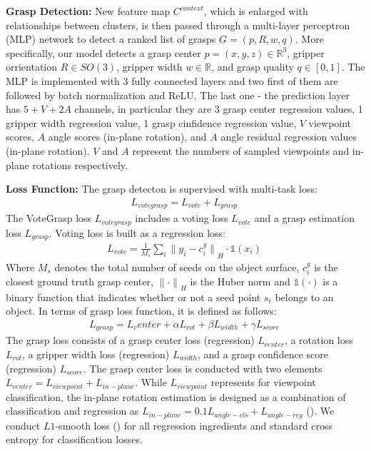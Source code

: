 \textbf{Grasp Detection:} New feature map $C^{context}$, which is enlarged with relationships between clusters, is then passed through a multi-layer perceptron (MLP) network to detect a ranked list of grasps $G=(p,R,w,q)$. More specifically, our model detects a grasp center $p=(x,y,z) \in \mathbb{R}^3$, gripper orrientation $R \in SO(3)$, gripper width $w \in \mathbb{R}$, and grasp quality $q \in [0,1]$. The MLP is implemented with 3 fully connected layers and two first of them are followed by batch normalization and ReLU. The last one - the prediction layer has $5+V+2A$ channels, in particular they are 3 grasp center regression values, 1 gripper width regression value, 1 grasp cinfidence regression value, $V$ viewpoint scores, $A$ angle scores (in-plane rotation), and $A$ angle residual regression values (in-plane rotation). $V$ and $A$ represent the numbers of sampled viewpoints and in-plane rotations respectively.

\textbf{Loss Function:} The grasp detecton is supervised with multi-task loss:
\begin{align}
L_{votegrasp} = L_{vote} + L_{grasp} \
\end{align}
The VoteGrasp loss $L_{votegrasp}$ includes a voting loss $L_{vote}$ and a grasp estimation loss $L_{grasp}$. Voting loss is built as a regression loss:
\begin{align}
L_{vote} = \frac{1}{M_s} \sum_{i}^{} {\lVert y_i-c^g_i \rVert}_H \cdot \mathds{1}(x_i)   \
\end{align}
Where $M_s$ denotes the total number of seeds on the object surface, $c^g_i$ is the closest ground truth grasp center, ${\lVert \cdot \rVert}_H$ is the Huber norm and $\mathds{1}(\cdot)$ is a binary function that indicates whether or not a seed point $s_i$ belongs to an object. In terms of grasp loss function, it is defined as follows: 
\begin{align}
L_{grasp} = L_center + \alpha L_{rot} + \beta L_{width} + \gamma L_{score} \
\end{align}
The grasp loss consists of a grasp center loss (regression) $L_{center}$, a rotation loss $L_{rot}$, a gripper width loss (regression) $L_{width}$, and a grasp confidence score (regression) $L_{score}$. The grasp center loss is conducted with two elements $L_{center} = L_{viewpoint} + L_{in-plane}$. While $L_{viewpoint}$ represents for viewpoint classification, the in-plane rotation estimation is designed as a combination of classification and regression as $L_{in-plane} = 0.1L_{angle-cls}+L_{angle-reg}$ (\textcolor{cyan}{\cite{qi2018frustum}}). We conduct $L1$-smooth loss (\textcolor{cyan}{\cite{ren2015faster}}) for all regression ingredients and standard cross entropy for classification losses. 

